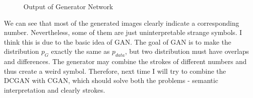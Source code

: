 \documentclass{article} %
\begin{document}
\begin{figure}[htbp]
\centering
{}%
%
\centering
\caption{Output of Generator Network}
\label{fig:DCGANoutput}
\end{figure}

We can see that most of the generated images clearly indicate a corresponding number. Nevertheless, some of them are just uninterpretable strange symbols. I think this is due to the basic idea of GAN. The goal of GAN is to make the distribution $p_G$ exactly the same as $p_{data}$, but two distribution must have overlaps and differences. The generator may combine the strokes of different numbers and thus create a weird symbol. Therefore, next time I will try to combine the DCGAN with CGAN, which should solve both the problems - semantic interpretation and clearly strokes.
\end{document}
